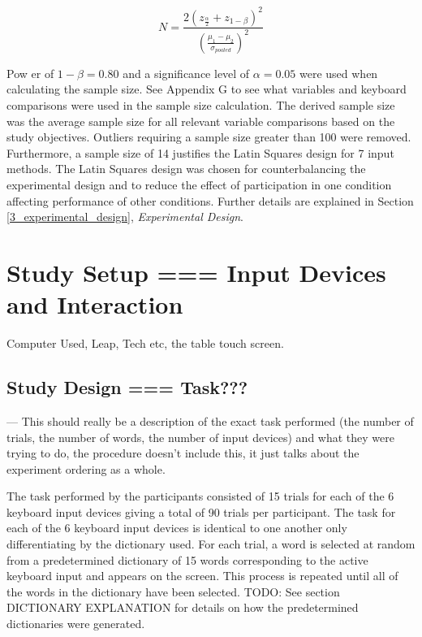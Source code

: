 \begin{equation}
N = \frac{2(z_{\frac{\alpha}{2}} + z_{1-\beta})^2}{(\frac{\mu_1 - \mu_2}{\sigma_{pooled}})^2}
\end{equation}

Pow	er of $1-\beta = 0.80$ and a significance level of $\alpha = 0.05$ were used when calculating the sample size. See Appendix G to see what variables and keyboard comparisons were used in the sample size calculation. The derived sample size was the average sample size for all relevant variable comparisons based on the study objectives. Outliers requiring a sample size greater than 100 were removed. Furthermore, a sample size of 14 justifies the Latin Squares design for 7 input methods. The Latin Squares design was chosen for counterbalancing the experimental design and to reduce the effect of participation in one condition affecting performance of other conditions. Further details are explained in Section \ref{3_experimental_design}, \textit{Experimental Design}.

\section{Study Setup === Input Devices and Interaction}

Computer Used, Leap, Tech etc, the table touch screen.

\subsection{Study Design === Task???}

--- This should really be a description of the exact task performed (the number of trials, the number of words, the number of input devices) and what they were trying to do, the procedure doesn't include this, it just talks about the experiment ordering as a whole.

The task performed by the participants consisted of 15 trials for each of the 6 keyboard input devices giving a total of 90 trials per participant. The task for each of the 6 keyboard input devices is identical to one another only differentiating by the dictionary used. For each trial, a word is selected at random from a predetermined dictionary of 15 words corresponding to the active keyboard input and appears on the screen. This process is repeated until all of the words in the dictionary have been selected. TODO: See section DICTIONARY EXPLANATION for details on how the predetermined dictionaries were generated.


